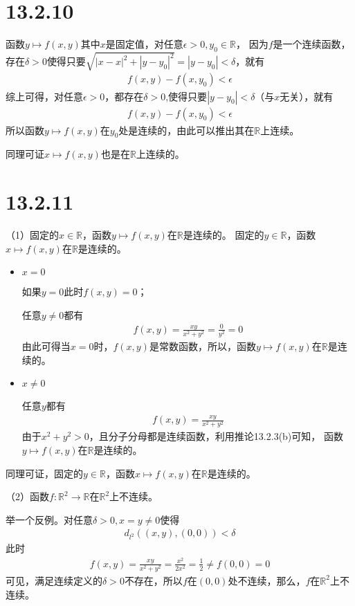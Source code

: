 \documentclass{article}
\begin{document}
\section*{13.2.10}

函数$y \mapsto f(x, y)$其中$x$是固定值，对任意$\epsilon > 0, y_0 \in \mathbb{R}$，
因为$f$是一个连续函数，
存在$\delta > 0$使得只要$\sqrt{|x - x|^2 + |y - y_0|^2} = |y - y_0| < \delta$，就有
\begin{align*}
  f(x, y) - f(x, y_0) < \epsilon
\end{align*}
综上可得，对任意$\epsilon > 0$，都存在$\delta > 0$,使得只要$|y - y_0| < \delta$（与$x$无关），就有
\begin{align*}
  f(x, y) - f(x, y_0) < \epsilon
\end{align*}
所以函数$y \mapsto f(x, y)$在$y_0$处是连续的，由此可以推出其在$\mathbb{R}$上连续。

同理可证$x \mapsto f(x, y)$也是在$\mathbb{R}$上连续的。

\section*{13.2.11}

（1）固定的$x \in \mathbb{R}$，函数$y \mapsto f(x, y)$在$\mathbb{R}$是连续的。
固定的$y \in \mathbb{R}$，函数$x \mapsto f(x, y)$在$\mathbb{R}$是连续的。

\begin{itemize}
  \item $x = 0$

        如果$y = 0$此时$f(x, y) = 0$；

        任意$y \neq 0$都有
        \begin{align*}
          f(x, y) = \frac{xy}{x^2 + y^2} = \frac{0}{y^2} = 0
        \end{align*}
        由此可得当$x = 0$时，$f(x, y)$是常数函数，所以，函数$y \mapsto f(x, y)$在$\mathbb{R}$是连续的。


  \item $x \neq 0$

        任意$y$都有
        \begin{align*}
          f(x, y) = \frac{xy}{x^2 + y^2}
        \end{align*}
        由于$x^2 + y^2 > 0$，且分子分母都是连续函数，利用推论13.2.3(b)可知，
        函数$y \mapsto f(x, y)$在$\mathbb{R}$是连续的。

\end{itemize}

同理可证，固定的$y \in \mathbb{R}$，函数$x \mapsto f(x, y)$在$\mathbb{R}$是连续的。

（2）函数$f: \mathbb{R}^2 \to \mathbb{R}$在$\mathbb{R}^2$上不连续。

举一个反例。对任意$\delta > 0, x = y \neq 0$使得
\begin{align*}
  d_{l^2}((x, y), (0, 0)) < \delta
\end{align*}
此时
\begin{align*}
  f(x, y) = \frac{xy}{x^2 + y^2} = \frac{x^2}{2x^2} = \frac{1}{2} \neq f(0, 0) = 0
\end{align*}
可见，满足连续定义的$\delta > 0$不存在，所以$f$在$(0, 0)$处不连续，那么，$f$在$\mathbb{R}^2$上不连续。
\end{document}
